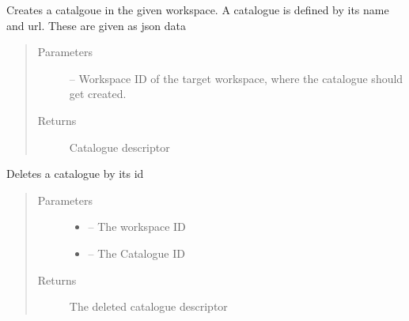 \documentclass[letterpaper,10pt,english]{sphinxmanual}
\begin{document}
\begin{fulllineitems}
\label{_source/son_editor.impl:son_editor.impl.cataloguesimpl.create_catalogue}
Creates a catalgoue in the given workspace. A catalogue is defined by its name and url. These are given as
json data
\begin{quote}\begin{description}
\item[{Parameters}] \leavevmode
{} -- Workspace ID of the target workspace, where the catalogue should get created.

\item[{Returns}] \leavevmode
Catalogue descriptor

\end{description}\end{quote}

\end{fulllineitems}


\begin{fulllineitems}
\label{_source/son_editor.impl:son_editor.impl.cataloguesimpl.delete}
Deletes a catalogue by its id
\begin{quote}\begin{description}
\item[{Parameters}] \leavevmode\begin{itemize}
\item {} 
 -- The workspace ID

\item {} 
 -- The Catalogue ID

\end{itemize}

\item[{Returns}] \leavevmode
The deleted catalogue descriptor

\end{description}\end{quote}

\end{fulllineitems}
\end{document}
